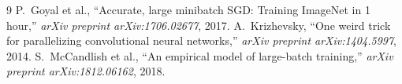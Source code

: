 \documentclass[11pt,a4paper]{article}
\theoremstyle{definition}
\begin{document}
\begin{thebibliography}{9}
 P.~Goyal et al., ``Accurate, large minibatch SGD: Training ImageNet in 1 hour,'' \emph{arXiv preprint arXiv:1706.02677}, 2017.
 A.~Krizhevsky, ``One weird trick for parallelizing convolutional neural networks,'' \emph{arXiv preprint arXiv:1404.5997}, 2014.
 S.~McCandlish et al., ``An empirical model of large-batch training,'' \emph{arXiv preprint arXiv:1812.06162}, 2018.
\end{thebibliography}
\end{document}

